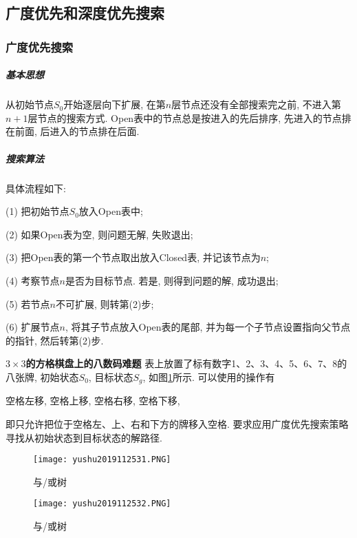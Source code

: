 \subsection{广度优先和深度优先搜索}
\subsubsection{广度优先搜索}
\subparagraph{基本思想}
    从初始节点$S_0$开始逐层向下扩展, 在第$n$层节点还没有全部搜索完之前, 不进入第$n+1$层节点的搜索方式. Open表中的节点总是按进入的先后排序, 先进入的节点排在前面, 后进入的节点排在后面.
\subparagraph{搜索算法} 具体流程如下:

\quad (1) 把初始节点$S_0$放入Open表中;

\quad (2) 如果Open表为空, 则问题无解, 失败退出;

\quad (3) 把Open表的第一个节点取出放入Closed表, 并记该节点为$n$;

\quad (4) 考察节点$n$是否为目标节点. 若是, 则得到问题的解, 成功退出;

\quad (5) 若节点$n$不可扩展, 则转第(2)步;

\quad (6) 扩展节点$n$, 将其子节点放入Open表的尾部, 并为每一个子节点设置指向父节点的指针, 然后转第(2)步.
\begin{example}
\textbf{$3\times 3$的方格棋盘上的八数码难题} 表上放置了标有数字1、2、3、4、5、6、7、8的八张牌, 初始状态$S_0$, 目标状态$S_g$, 如图\ref{AI32fig2019120231}所示. 可以使用的操作有
\begin{center}
    空格左移, 空格上移, 空格右移, 空格下移,
\end{center}
即只允许把位于空格左、上、右和下方的牌移入空格. 要求应用广度优先搜索策略寻找从初始状态到目标状态的解路径.
\end{example}
\begin{figure}[H]
\vspace{-0.5cm}
\centering
\texttt{[image: yushu2019112531.PNG]}
\caption{与/或树 }
\label{AI32fig2019120231}
\end{figure}
\begin{figure}[H]
\centering
\texttt{[image: yushu2019112532.PNG]}
\caption{与/或树 }
\label{AI32fig32}
\end{figure}
